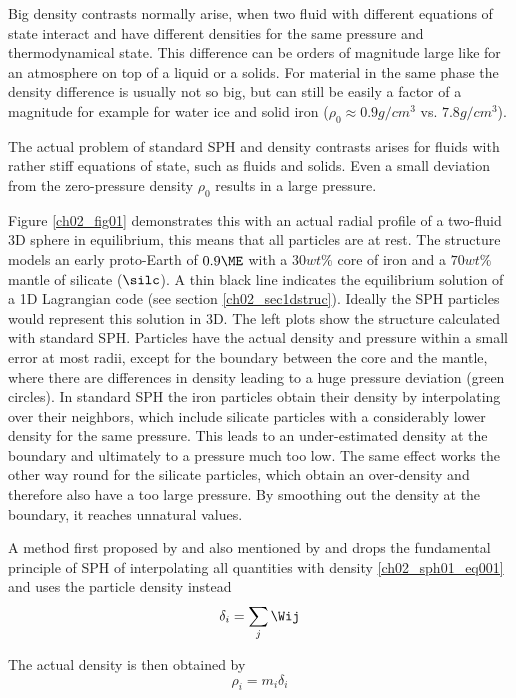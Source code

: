 Big density contrasts normally arise, when two fluid with different equations of state interact and have different densities for the same pressure and thermodynamical state. This difference can be orders of magnitude large like for an atmosphere on top of a liquid or a solids. For material in the same phase the density difference is usually not so big, but can still be easily a factor of a magnitude for example for water ice and solid iron ($\rho_0 \approx 0.9 g/cm^3$ vs. $7.8 g/cm^3$).

The actual problem of standard SPH and density contrasts arises for fluids with rather stiff equations of state, such as fluids and solids. Even a small deviation from the zero-pressure density $\rho_0$  results in a large pressure. 

Figure \ref{ch02_fig01} demonstrates this with an actual radial profile of a two-fluid 3D sphere in equilibrium, this means that all particles are at rest. The structure models an early proto-Earth of $0.9 \ME$ with a $30 wt\%$ core of iron and a $70 wt\%$ mantle of silicate ($\silc$). A thin black line indicates the equilibrium solution of a 1D Lagrangian code (see section \ref{ch02_sec1dstruc}). Ideally the SPH particles would represent this solution in 3D. The left plots show the structure calculated with standard SPH. Particles have the actual density and pressure within a small error at most radii, except for the boundary between the core and the mantle, where there are differences in density leading to a huge pressure deviation (green circles). In standard SPH the iron particles obtain their density by interpolating over their neighbors, which include silicate particles with a considerably lower density for the same pressure. This leads to an under-estimated density at the boundary and ultimately to a pressure much too low. The same effect works the other way round for the silicate particles, which obtain an over-density and therefore also have a too large pressure.  By smoothing out the density at the boundary, it reaches unnatural values. 

A method first proposed by \citep{Ott:2003p3727} and also mentioned by \cite{Solenthaler:2008p3720} and \cite{Price:2004p2613} drops the fundamental principle of SPH of interpolating all quantities with density \ref{ch02_sph01_eq001} and uses the particle density instead 
\begin{equation}
\label{ch02_sph01_eq030}
\delta_i = \sum_{j} \Wij
\end{equation}

The actual density is then obtained by 
\begin{equation}
\label{ch02_sph01_eq031}
\rho_i = m_i \delta_i
\end{equation}

